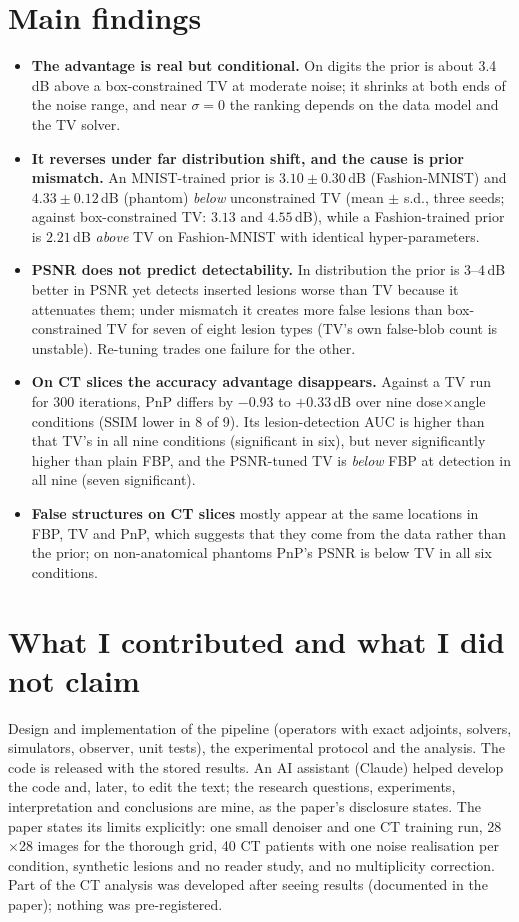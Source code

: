 \documentclass[10pt,a4paper]{article}
\begin{document}
\section*{Main findings}
\begin{itemize}
\item \textbf{The advantage is real but conditional.} On digits the prior is about 3.4\,dB above a box-constrained TV at moderate noise; it shrinks at both ends of the noise range, and near $\sigma=0$ the ranking depends on the data model and the TV solver.
\item \textbf{It reverses under far distribution shift, and the cause is prior mismatch.} An MNIST-trained prior is $3.10\pm0.30$\,dB (Fashion-MNIST) and $4.33\pm0.12$\,dB (phantom) \emph{below} unconstrained TV (mean $\pm$ s.d., three seeds; against box-constrained TV: $3.13$ and $4.55$\,dB), while a Fashion-trained prior is $2.21$\,dB \emph{above} TV on Fashion-MNIST with identical hyper-parameters.
\item \textbf{PSNR does not predict detectability.} In distribution the prior is $3$--$4$\,dB better in PSNR yet detects inserted lesions worse than TV because it attenuates them; under mismatch it creates more false lesions than box-constrained TV for seven of eight lesion types (TV's own false-blob count is unstable). Re-tuning trades one failure for the other.
\item \textbf{On CT slices the accuracy advantage disappears.} Against a TV run for 300 iterations, PnP differs by $-0.93$ to $+0.33$\,dB over nine dose$\times$angle conditions (SSIM lower in 8 of 9). Its lesion-detection AUC is higher than that TV's in all nine conditions (significant in six), but never significantly higher than plain FBP, and the PSNR-tuned TV is \emph{below} FBP at detection in all nine (seven significant).
\item \textbf{False structures on CT slices} mostly appear at the same locations in FBP, TV and PnP, which suggests that they come from the data rather than the prior; on non-anatomical phantoms PnP's PSNR is below TV in all six conditions.
\end{itemize}

\section*{What I contributed and what I did not claim}
Design and implementation of the pipeline (operators with exact adjoints, solvers, simulators, observer, unit tests), the experimental protocol and the analysis. The code is released with the stored results.
An AI assistant (Claude) helped develop the code and, later, to edit the text; the research questions, experiments, interpretation and conclusions are mine, as the paper's disclosure states.
The paper states its limits explicitly: one small denoiser and one CT training run, 28$\times$28 images for the thorough grid, 40 CT patients with one noise realisation per condition, synthetic lesions and no reader study, and no multiplicity correction.
Part of the CT analysis was developed after seeing results (documented in the paper); nothing was pre-registered.
\end{document}
